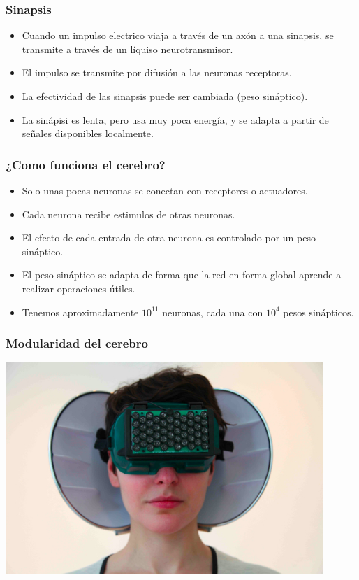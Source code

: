 \documentclass{beamer}
\begin{document}
\begin{frame}
  \frametitle{Sinapsis}
  \begin{itemize}
  \item Cuando un impulso electrico viaja a través de un axón a una sinapsis, se transmite
    a través de un líquiso neurotransmisor.
  \item El impulso se transmite por difusión a las neuronas receptoras.
  \item La efectividad de las sinapsis puede ser cambiada (peso sináptico).
  \item La sinápisi es lenta, pero usa muy poca energía, y se adapta a partir de señales disponibles localmente.
  \end{itemize}
\end{frame}

\begin{frame}
  \frametitle{¿Como funciona el cerebro?}
  \begin{itemize}
  \item Solo unas pocas neuronas se conectan con receptores o actuadores.
  \item Cada neurona recibe estimulos de otras neuronas.
  \item El efecto de cada entrada de otra neurona es controlado por
    un peso sináptico.
  \item El peso sináptico se adapta de forma que la red en forma global
    aprende a realizar operaciones útiles.
  \item Tenemos aproximadamente $10^11$ neuronas, cada una con $10^4$ pesos sinápticos.
  \end{itemize}
\end{frame}

\begin{frame}
  \frametitle{Modularidad del cerebro}
  \includegraphics[width=0.9\textwidth]{echo.jpg}  
\end{frame}
\end{document}
